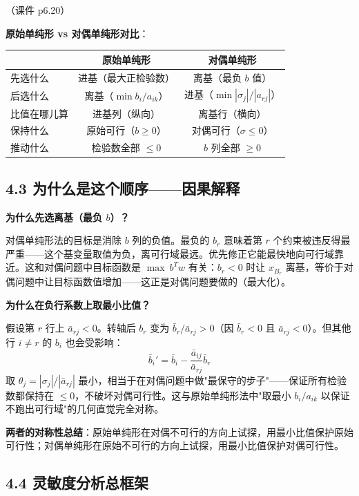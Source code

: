 （课件 p6.20）

\medskip
\textbf{原始单纯形 vs 对偶单纯形对比}：
\medskip
{\small
\setlength{\tabcolsep}{2pt}
\begin{tabular}{@{}lcc@{}}
\toprule
& \textbf{原始单纯形} & \textbf{对偶单纯形} \\
\midrule
先选什么 & 进基（最大正检验数） & 离基（最负 $b$ 值） \\
后选什么 & 离基（$\min b_i/a_{ik}$） & 进基（$\min |\sigma_j|/|a_{rj}|$） \\
比值在哪儿算 & 进基列（纵向） & 离基行（横向） \\
保持什么 & 原始可行（$b\ge 0$） & 对偶可行（$\sigma \le 0$） \\
推动什么 & 检验数全部 $\le 0$ & $b$ 列全部 $\ge 0$ \\
\bottomrule
\end{tabular}
}

\subsection{4.3 为什么是这个顺序——因果解释}

\textbf{为什么先选离基（最负 $b$）？}

对偶单纯形法的目标是消除 $b$ 列的负值。最负的 $b_r$ 意味着第 $r$ 个约束被违反得最严重——这个基变量取值为负，离可行域最远。优先修正它能最快地向可行域靠近。这和对偶问题中目标函数是 $\max\ b^T w$ 有关：$b_r < 0$ 时让 $x_{B_r}$ 离基，等价于对偶问题中让目标函数值增加——这正是对偶问题要做的（最大化）。

\textbf{为什么在负行系数上取最小比值？}

假设第 $r$ 行上 $\bar{a}_{rj} < 0$。转轴后 $b_r$ 变为 $\bar{b}_r / \bar{a}_{rj} > 0$（因 $\bar{b}_r < 0$ 且 $\bar{a}_{rj} < 0$）。但其他行 $i \neq r$ 的 $b_i$ 也会受影响：
\[
\bar{b}_i' = \bar{b}_i - \frac{\bar{a}_{ij}}{\bar{a}_{rj}}\bar{b}_r
\]
取 $\theta_j = |\sigma_j|/|\bar{a}_{rj}|$ 最小，相当于在对偶问题中做"最保守的步子"——保证所有检验数都保持在 $\le 0$，不破坏对偶可行性。这与原始单纯形法中"取最小 $b_i/a_{ik}$ 以保证不跑出可行域"的几何直觉完全对称。

\textbf{两者的对称性总结}：原始单纯形在对偶不可行的方向上试探，用最小比值保护原始可行性；对偶单纯形在原始不可行的方向上试探，用最小比值保护对偶可行性。

\subsection{4.4 灵敏度分析总框架}

